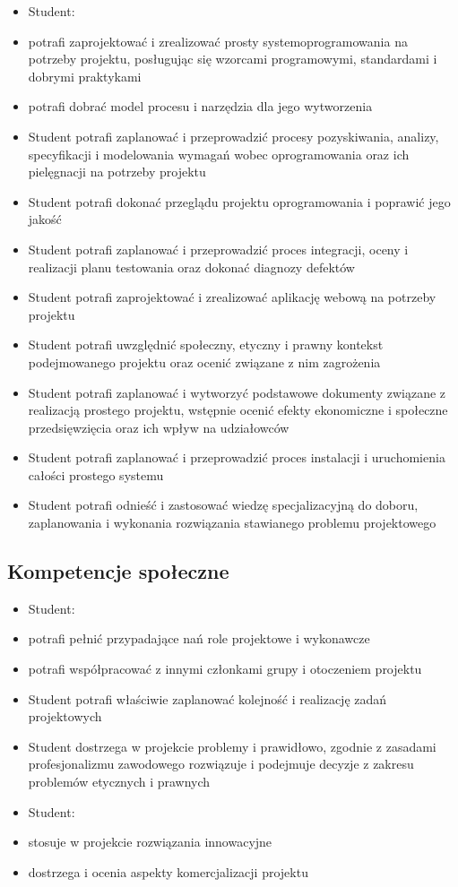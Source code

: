 \documentclass[12pt, a4paper]{article}
\begin{document}
\begin{itemize}
  \item Student:
  \item potrafi zaprojektować i zrealizować prosty systemoprogramowania na potrzeby projektu, posługując się wzorcami programowymi, standardami i dobrymi praktykami
  \item potrafi dobrać model procesu i narzędzia dla jego wytworzenia
  \item Student potrafi zaplanować i przeprowadzić procesy pozyskiwania, analizy, specyfikacji i modelowania wymagań wobec oprogramowania oraz ich pielęgnacji na potrzeby projektu
  \item Student potrafi dokonać przeglądu projektu oprogramowania i poprawić jego jakość
  \item Student potrafi zaplanować i przeprowadzić proces integracji, oceny i realizacji planu testowania oraz dokonać diagnozy defektów
  \item Student potrafi zaprojektować i zrealizować aplikację webową na potrzeby projektu
  \item Student potrafi uwzględnić społeczny, etyczny i prawny kontekst podejmowanego projektu oraz ocenić związane z nim zagrożenia
  \item Student potrafi zaplanować i wytworzyć podstawowe dokumenty związane z realizacją prostego projektu, wstępnie ocenić efekty ekonomiczne i społeczne przedsięwzięcia oraz ich wpływ na udziałowców
  \item Student potrafi zaplanować i przeprowadzić proces instalacji i uruchomienia całości prostego systemu
  \item Student potrafi odnieść i zastosować wiedzę specjalizacyjną do doboru, zaplanowania i wykonania rozwiązania stawianego problemu projektowego
\end{itemize}

\subsection*{Kompetencje społeczne}
\begin{itemize}
  \item Student:
  \item potrafi pełnić przypadające nań role projektowe i wykonawcze
  \item potrafi współpracować z innymi członkami grupy i otoczeniem projektu
  \item Student potrafi właściwie zaplanować kolejność i realizację zadań projektowych
  \item Student dostrzega w projekcie problemy i prawidłowo, zgodnie z zasadami profesjonalizmu zawodowego rozwiązuje i podejmuje decyzje z zakresu problemów etycznych i prawnych
  \item Student:
  \item stosuje w projekcie rozwiązania innowacyjne
  \item dostrzega i ocenia aspekty komercjalizacji projektu
\end{itemize}
\end{document}
